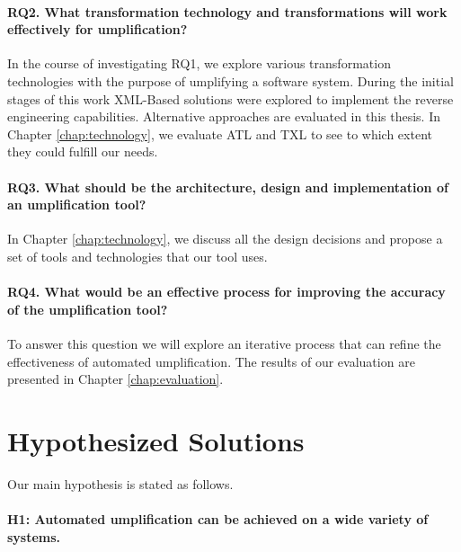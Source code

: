\paragraph*{RQ2. What transformation technology and transformations  will work effectively for umplification?}

In the course of investigating RQ1, we explore various transformation technologies with the purpose of umplifying a software system. During the initial stages of this work \cite{DoctoralSymposiumWCRE} XML-Based solutions were explored to implement the reverse engineering capabilities. Alternative approaches are evaluated in this thesis. In Chapter \ref{chap:technology}, we evaluate ATL and TXL to see to which extent they could fulfill our needs. 


\paragraph*{RQ3. What should be the architecture, design and implementation of an umplification tool?}

In Chapter \ref{chap:technology}, we discuss all the design decisions and propose a set of tools and technologies that our  tool uses.

\paragraph*{RQ4. What would be an effective process for improving the accuracy of the umplification tool?}

To answer this question we will explore an iterative process that can refine the effectiveness of automated umplification. The results of our evaluation are presented in Chapter \ref{chap:evaluation}.

\section{Hypothesized Solutions}

Our main hypothesis is stated as follows.

\paragraph*{H1: Automated umplification can be achieved on a wide variety of systems.}

